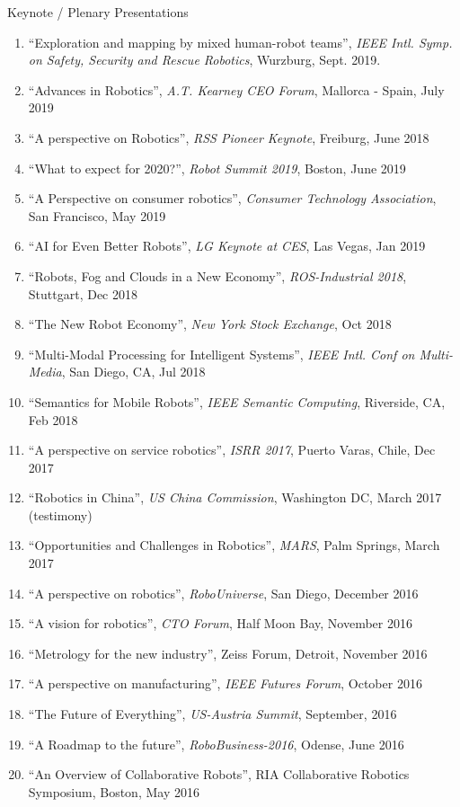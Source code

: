 \documentclass{article}
\begin{document}
\begin{cv}
\begin{cvlist}{Keynote / Plenary Presentations}
\begin{enumerate}
  \item ``Exploration and mapping by mixed human-robot teams'', {\em IEEE Intl. Symp. on Safety, Security and Rescue Robotics},
    Wurzburg, Sept. 2019.
  \item  ``Advances in Robotics'', {\em A.T. Kearney CEO Forum}, Mallorca - Spain, July 2019
  \item ``A perspective on Robotics'', {\em RSS Pioneer Keynote}, Freiburg, June 2018
  \item ``What to expect for 2020?'', {\em Robot Summit 2019}, Boston, June 2019
  \item ``A Perspective on consumer robotics'', {\em Consumer Technology Association}, San Francisco, May 2019
  \item ``AI for Even Better Robots'', {\em LG Keynote at CES}, Las Vegas, Jan 2019
  \item ``Robots, Fog and Clouds in a New Economy'', {\em ROS-Industrial 2018}, Stuttgart, Dec 2018
  \item ``The New Robot Economy'', {\em New York Stock Exchange}, Oct 2018
  \item ``Multi-Modal Processing for Intelligent Systems'', {\em IEEE Intl. Conf on Multi-Media}, San Diego, CA, Jul 2018
  \item ``Semantics for Mobile Robots'', {\em IEEE Semantic Computing}, Riverside, CA, Feb 2018
  \item ``A perspective on service robotics'', {\em ISRR 2017}, Puerto Varas, Chile, Dec 2017
  \item ``Robotics in China'', {\em US China Commission}, Washington DC, March 2017 (testimony)
  \item ``Opportunities and Challenges in Robotics'', {\em MARS}, Palm Springs, March 2017
  \item ``A perspective on robotics'', {\em RoboUniverse}, San Diego,  December 2016
  \item ``A vision for robotics'', {\em CTO Forum}, Half Moon Bay, November 2016
  \item ``Metrology for the new industry'', Zeiss Forum, Detroit,  November 2016
  \item ``A perspective on manufacturing'', {\em IEEE Futures Forum},  October 2016
  \item ``The Future of Everything'', {\em US-Austria Summit},  September, 2016
  \item ``A Roadmap to the future'', {\em RoboBusiness-2016}, Odense,  June 2016
  \item ``An Overview of Collaborative Robots'', RIA Collaborative Robotics Symposium, Boston, May 2016

\end{enumerate}
\end{cvlist}
\end{cv}
\end{document}
